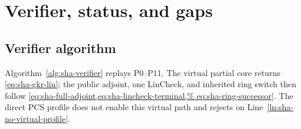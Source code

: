\section{Verifier, status, and gaps}

\subsection{Verifier algorithm}

Algorithm~\ref{alg:sha-verifier} replays P0--P11.  The virtual partial core
returns \cref{eq:sha-gkr-lin}; the public adjoint, one LinCheck, and inherited
ring switch then follow \cref{eq:sha-full-adjoint,eq:sha-lincheck-terminal,%
eq:sha-ring-successor}.  The direct PCS profile does not enable this virtual
path and rejects on Line~\ref{ln:sha-no-virtual-profile}.

